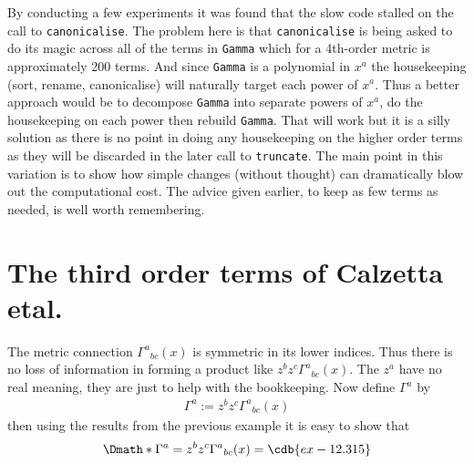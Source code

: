 \documentclass[a4paper,12pt]{article}
\numberwithin{equation}{section}%
\begin{document}
By conducting a few experiments it was found that the slow code stalled on the call to
\verb|canonicalise|. The problem here is that \verb|canonicalise| is being asked to do its
magic across all of the terms in \verb|Gamma| which for a 4th-order metric is approximately
200 terms. And since \verb|Gamma| is a polynomial in $x^{a}$ the housekeeping (sort, rename,
canonicalise) will naturally target each power of $x^{a}$. Thus a better approach would be
to decompose \verb|Gamma| into separate powers of $x^{a}$, do the housekeeping on each power
then rebuild \verb|Gamma|. That will work but it is a silly solution as there is no point in
doing any housekeeping on the higher order terms as they will be discarded in the later call
to \verb|truncate|. The main point in this variation is to show how simple changes (without
thought) can dramatically blow out the computational cost. The advice given earlier, to keep
as few terms as needed, is well worth remembering.

\clearpage

\section{The third order terms of Calzetta etal.}
\label{sec:ex-12}
\ResetCounters



The metric connection $\Gamma^{a}{}_{bc}(x)$ is symmetric in its lower indices. Thus there is
no loss of information in forming a product like $z^{b} z^{c} \Gamma^{a}{}_{bc}(x)$. The
$z^{a}$ have no real meaning, they are just to help with the bookkeeping. Now define
$\Gamma^{a}$ by \begin{align*}
   \Gamma^{a} := z^{b} z^{c} \Gamma^{a}{}_{bc}(x)
\end{align*}
then using the results from the previous example it is easy to show that
\begin{dgroup*}[spread=5pt]
   \Dmath*{ \Gamma^{a} = z^{b} z^{c} \Gamma^{a}{}_{bc}(x) = \cdb{ex-12.315} }
\end{dgroup*}
\end{document}
